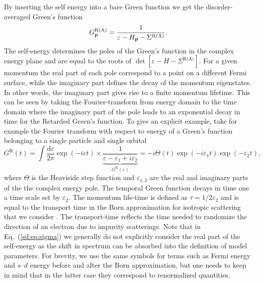 By inserting the self energy into a bare Green function we get the disorder-averaged Green's function
\begin{equation}
	G^\text{R(A)}_{\boldsymbol{p}} = \frac{1}{\varepsilon-H_{\boldsymbol{p}}-\Sigma^\text{R(A)}}.
\end{equation}
The self-energy determines the poles of the Green's function in the complex energy plane and are equal to the roots of $\det[\varepsilon-H-\Sigma^\text{R(A)}]$. For a given momentum the real part of each pole correspond to a point on a different Fermi surface, while the imaginary part defines the decay of the momentum eigenstates. In other words, the imaginary part gives rise to a finite momentum lifetime. This can be seen by taking the Fourier-transform from energy domain to the time domain where the imaginary part of the pole leads to an exponential decay in time for the Retarded Green's function. To give an explicit example, take for example the Fourier transform with respect to energy of a Green's function belonging to a single particle and single orbital 
\begin{equation}
	G^\text{R}(t) = \int\!\frac{\mathrm{d}\varepsilon}{2\pi} \exp(-i \varepsilon t)\times\underbrace{\frac{1}{\varepsilon-\varepsilon_1+i\varepsilon_2}}_{G^\text{R}(\varepsilon)} = -i\Theta(t)\exp(-i\varepsilon_1t)\exp(-\varepsilon_2 t), 
\end{equation}
where $\Theta$ is the Heaviside step function and $\varepsilon_{1,2}$ are the real and imaginary parts of the the complex energy pole. The temporal Green function decays in time one a time scale set by $\varepsilon_2$. The momentum life-time is defined as $\tau = 1/2\varepsilon_2$ and is equal to the transport time in the Born approximation for isotropic scattering that we consider \cite{rammer_quantum_1986}. The transport-time reflects the time needed to randomize the direction of an electron due to impurity scatterings. Note that in Eq.~(\ref{sd:eq:sigma}) we generally do not explicitly consider the real part of the self-energy as the shift in spectrum can be absorbed into the definition of model parameters. For brevity, we use the same symbols for terms such as Fermi energy and $s$--$d$ energy before and after the Born approximation, but one needs to keep in mind that in the latter case they correspond to renormalized quantities. 

